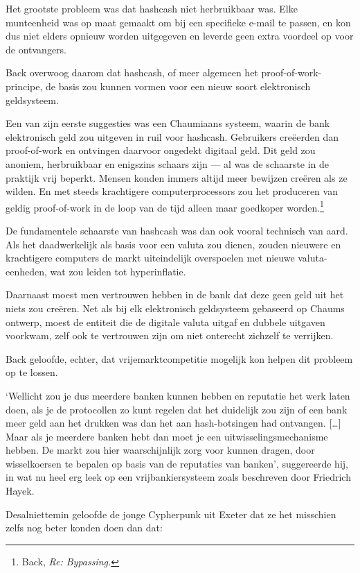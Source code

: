 \documentclass[
  a5paper,
  smalldemyvopaper,11pt,twoside,onecolumn,openright,extrafontsizes,
hidelinks]{memoir}
\begin{document}
Het grootste probleem was dat hashcash niet herbruikbaar was. Elke
munteenheid was op maat gemaakt om bij een specifieke e-mail te passen,
en kon dus niet elders opnieuw worden uitgegeven en leverde geen extra
voordeel op voor de ontvangers.

Back overwoog daarom dat hashcash, of meer algemeen het
proof-of-work-principe, de basis zou kunnen vormen voor een nieuw soort
elektronisch geldsysteem.

Een van zijn eerste suggesties was een Chaumiaans systeem, waarin de
bank elektronisch geld zou uitgeven in ruil voor hashcash. Gebruikers
creëerden dan proof-of-work en ontvingen daarvoor ongedekt digitaal
geld. Dit geld zou anoniem, herbruikbaar en enigszins schaars zijn ---
al was de schaarste in de praktijk vrij beperkt. Mensen konden immers
altijd meer bewijzen creëren als ze wilden. En met steeds krachtigere
computerprocessors zou het produceren van geldig proof-of-work in de
loop van de tijd alleen maar goedkoper worden.\footnote{Back, \emph{Re:
  Bypassing.}}

De fundamentele schaarste van hashcash was dan ook vooral technisch van
aard. Als het daadwerkelijk als basis voor een valuta zou dienen, zouden
nieuwere en krachtigere computers de markt uiteindelijk overspoelen met
nieuwe valuta-eenheden, wat zou leiden tot hyperinflatie.

Daarnaast moest men vertrouwen hebben in de bank dat deze geen geld uit
het niets zou creëren. Net als bij elk elektronisch geldsysteem
gebaseerd op Chaums ontwerp, moest de entiteit die de digitale valuta
uitgaf en dubbele uitgaven voorkwam, zelf ook te vertrouwen zijn om niet
onterecht zichzelf te verrijken.

Back geloofde, echter, dat vrijemarktcompetitie mogelijk kon helpen dit
probleem op te lossen.

`Wellicht zou je dus meerdere banken kunnen hebben en reputatie het werk
laten doen, als je de protocollen zo kunt regelen dat het duidelijk zou
zijn of een bank meer geld aan het drukken was dan het aan
hash-botsingen had ontvangen. {[}\ldots{]} Maar als je meerdere banken
hebt dan moet je een uitwisselingsmechanisme hebben. De markt zou hier
waarschijnlijk zorg voor kunnen dragen, door wisselkoersen te bepalen op
basis van de reputaties van banken', suggereerde hij, in wat nu heel erg
leek op een vrijbankiersysteem zoals beschreven door Friedrich Hayek.

Desalniettemin geloofde de jonge Cypherpunk uit Exeter dat ze het
misschien zelfs nog beter konden doen dan dat:
\end{document}
